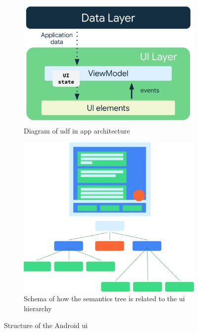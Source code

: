 \begin{figure}[htbp!]
    \centering
    \begin{subfigure}[b]{0.5\textwidth}
        \centering
        \includegraphics[width=\textwidth]{graphics/android_udf}
        \caption{Diagram of \gls{udf} in app architecture \cite{android_ui_layer}}
        \label{fig:android_udf}
    \end{subfigure}
    \hfill
    \begin{subfigure}[b]{0.4\textwidth}
        \centering
        \includegraphics[width=\textwidth]{graphics/android_semantics-ui-tree}
        \caption{Schema of how the semantics tree is related to the \gls{ui} hierarchy \cite{android_semantics_compose}}
        \label{fig:android_semantics_ui_tree}
    \end{subfigure}
    \caption{Structure of the Android \gls{ui}}
    \label{fig:android_tree}
\end{figure}

